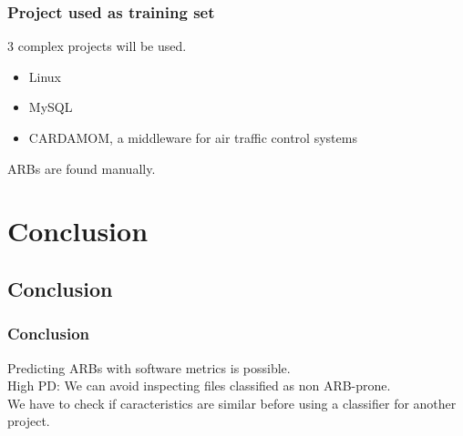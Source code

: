 \documentclass{beamer}
\begin{document}
\begin{frame}
 \frametitle{Project used as training set}
 3 complex projects will be used.\\
 \begin{itemize}
  \item Linux
  \item MySQL
  \item CARDAMOM, a middleware for air traffic control systems
 \end{itemize}
 \vspace{0.2cm}
 ARBs are found manually.\\
\end{frame}









\section{Conclusion}
\subsection{Conclusion}
\begin{frame}
 \frametitle{Conclusion}
 Predicting ARBs with software metrics is possible.\\
 \vspace{1cm}
 High PD: We can avoid inspecting files classified as non ARB-prone.\\
 \vspace{1cm}
 We have to check if caracteristics are similar before using a classifier for another project.
\end{frame}
\end{document}
